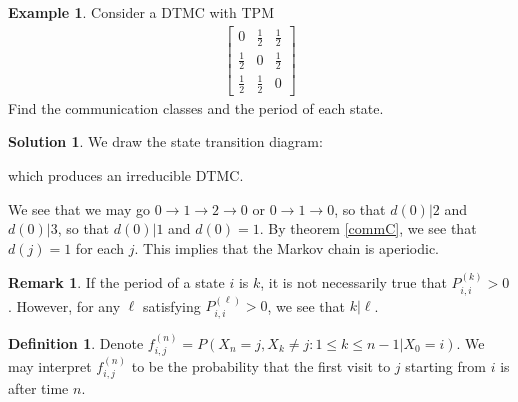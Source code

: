 \documentclass[11pt]{amsart}
\theoremstyle{definition}
\newtheorem{definition}[theorem]{Definition}
\newtheorem{remark}[theorem]{Remark}
\newtheorem{example}[theorem]{Example}
\newtheorem{solution}[theorem]{Solution}
\numberwithin{equation}{section}
\begin{document}
 \begin{example}
     Consider a DTMC with TPM
     \begin{align*}
         \begin{bmatrix}
             0 & \frac{1}{2} & \frac{1}{2}\\
             \frac{1}{2} & 0 & \frac{1}{2}\\
             \frac{1}{2} & \frac{1}{2} & 0
         \end{bmatrix}
     \end{align*}
     Find the communication classes and the period of each state.
 \end{example}
 \addtocounter{theorem}{-1}
 \begin{solution}
     We draw the state transition diagram:
     \begin{center}
     \end{center}
     which produces an irreducible DTMC.
     
     We see that we may go $0\to 1\to 2\to 0$ or $0\to 1\to0$, so that $d(0)|2$ and $d(0)|3$, so that $d(0)|1$ and $d(0)=1$. By theorem \ref{commC}, we see that $d(j)=1$ for each $j$. This implies that the Markov chain is aperiodic.
 \end{solution}
 \begin{remark}
     If the period of a state $i$ is $k$, it is not necessarily true that $P_{i,i}^{(k)}>0$. However, for any $\ell$ satisfying $P_{i,i}^{(\ell)}>0$, we see that $k|\ell$.
 \end{remark}
 \begin{definition}
     Denote $f_{i,j}^{(n)}=P(X_n=j,X_k\ne j:1\le k\le n-1|X_0=i)$. We may interpret $f_{i,j}^{(n)}$ to be the probability that the first visit to $j$ starting from $i$ is after time $n$.
 \end{definition}
\end{document}
